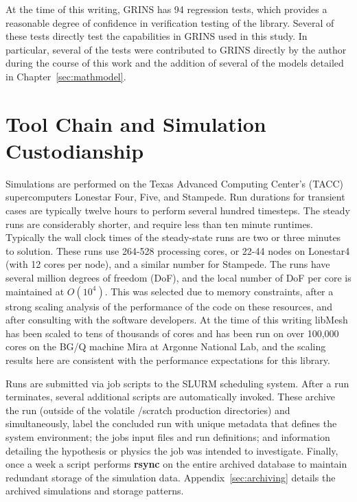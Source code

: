 At the time of this writing, GRINS has 94 regression tests, which
provides a reasonable degree of confidence in verification testing of
the library. Several of these tests directly test the capabilities in
GRINS used in this study. In particular, several of the tests were
contributed to GRINS directly by the author during the course of this
work and the addition of several of the models detailed in
Chapter~\ref{sec:mathmodel}. 


\section{Tool Chain and Simulation Custodianship}

Simulations are performed on the Texas Advanced Computing Center's 
(TACC) supercomputers Lonestar Four, Five, and Stampede. Run
durations for transient cases are typically twelve hours to perform
several hundred timesteps.  The steady runs are considerably shorter,
and require less than ten minute runtimes. Typically  the wall clock
times of the steady-state runs are two or three minutes to solution. 
These runs use 264-528 processing cores, or 22-44 nodes on Lonestar4
(with 12 cores per node), and a similar number for Stampede. The runs have 
several million degrees of freedom (DoF), and the local number of DoF
per core is maintained at $O(10^4)$. This was selected due to memory
constraints, after a strong scaling analysis of the performance of the
code on these resources, and after consulting with the software developers.  
At the time of this writing libMesh has been scaled to tens of thousands of
cores and has been run on over 100,000 cores on the BG/Q machine Mira at
Argonne National Lab\cite{gaston2013massive}, and the scaling results
here are consistent with the performance expectations for this library.


Runs are submitted via job scripts to the SLURM\cite{yoo2003slurm}
scheduling system. After a run terminates, several additional scripts
are automatically invoked.  
These archive the run (outside of the volatile /scratch 
production directories) and simultaneously, label the concluded run with
unique metadata that defines the system environment; the jobs input
files and run definitions; and information detailing the
hypothesis or physics the job was intended to investigate. Finally, once 
a week a script performs \textbf{rsync} on the entire archived database to
maintain redundant storage of the simulation
data. Appendix~\ref{sec:archiving} details the archived simulations and
storage patterns. 

